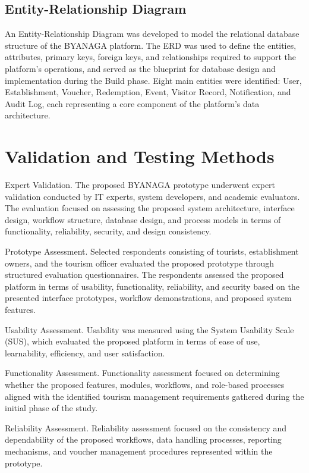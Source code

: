 \documentclass{research}
\begin{document}
    \subsection{Entity-Relationship Diagram}

    An Entity-Relationship Diagram was developed to model the relational
    database structure of the BYANAGA platform. The ERD was used to define
    the entities, attributes, primary keys, foreign keys, and relationships
    required to support the platform's operations, and served as the blueprint
    for database design and implementation during the Build phase. Eight main
    entities were identified: User, Establishment, Voucher, Redemption, Event,
    Visitor Record, Notification, and Audit Log, each representing a core
    component of the platform's data architecture.

\section{Validation and Testing Methods}

Expert Validation. The proposed BYANAGA prototype underwent expert validation conducted by IT experts, system developers, and academic evaluators. The evaluation focused on assessing the proposed system architecture, interface design, workflow structure, database design, and process models in terms of functionality, reliability, security, and design consistency.

Prototype Assessment. Selected respondents consisting of tourists, establishment owners, and the tourism officer evaluated the proposed prototype through structured evaluation questionnaires. The respondents assessed the proposed platform in terms of usability, functionality, reliability, and security based on the presented interface prototypes, workflow demonstrations, and proposed system features.

Usability Assessment. Usability was measured using the System Usability Scale (SUS), which evaluated the proposed platform in terms of ease of use, learnability, efficiency, and user satisfaction.

Functionality Assessment. Functionality assessment focused on determining whether the proposed features, modules, workflows, and role-based processes aligned with the identified tourism management requirements gathered during the initial phase of the study.

Reliability Assessment. Reliability assessment focused on the consistency and dependability of the proposed workflows, data handling processes, reporting mechanisms, and voucher management procedures represented within the prototype.
\end{document}
